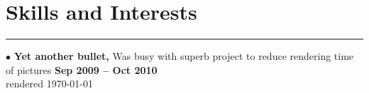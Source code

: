 \section{Skills and Interests}
\noindent\rule{\textwidth}{\hlinewidth}
    $\bullet$ \textbf{Yet another bullet,}
    Was busy with superb project to reduce rendering time of pictures
\hfill\textbf{Sep 2009 -- Oct 2010}\\
\vfill
\centering rendered \today

